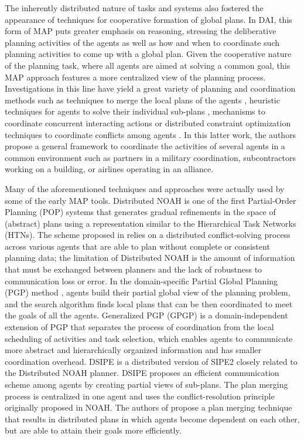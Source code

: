 \documentclass[12pt]{article}
\begin{document}
The inherently distributed nature of tasks and systems also fostered the appearance of techniques for cooperative formation of global plans. In DAI, this form of MAP puts greater emphasis on reasoning, stressing the deliberative planning activities of the agents as well as how and when to coordinate such planning activities to come up with a global plan. Given the cooperative nature of the planning task, where all agents are aimed at solving a common goal, this MAP approach features a more centralized view of the planning process. Investigations in this line have yield a great variety of planning and coordination methods such as techniques to merge the local plans of the agents \cite{Ephrati1994DivideAC}\cite{desJardins1999CoordinatingAD}\cite{1373700}, heuristic techniques for agents to solve their individual sub-plans \cite{Ephrati1997AHT}, mechanisms to coordinate concurrent interacting actions \cite{Boutilier_2001} or distributed constraint optimization techniques to coordinate conflicts among agents \cite{1373700}. In this latter work, the authors propose a general framework to coordinate the activities of several agents in a common environment such as partners in a military coordination, subcontractors working on a building, or airlines operating in an alliance.

Many of the aforementioned techniques and approaches were actually used by some of the early MAP tools. Distributed NOAH \cite{10.5555/1624861.1624903} is one of the first Partial-Order Planning (POP) systems that generates gradual refinements in the space of (abstract) plans using a representation similar to the Hierarchical Task Networks (HTNs). The scheme proposed in \cite{10.5555/1624861.1624903} relies on a distributed conflict-solving process across various agents that are able to plan without complete or consistent planning data; the limitation of Distributed NOAH is the amount of information that must be exchanged between planners and the lack of robustness to communication loss or error. In the domain-specific Partial Global Planning (PGP) method \cite{120067}, agents build their partial global view of the planning problem, and the search algorithm finds local plans that can be then coordinated to meet the goals of all the agents. Generalized PGP (GPGP) is a domain-independent extension of PGP \cite{decker_lesser_1992} that separates the process of coordination from the local scheduling of activities and task selection, which enables agents to communicate more abstract and hierarchically organized information and has smaller coordination overhead. DSIPE \cite{desJardins1999CoordinatingAD} is a distributed version of SIPE2 \cite{10.5555/52077} closely related to the Distributed NOAH planner. DSIPE proposes an efficient communication scheme among agents by creating partial views of sub-plans. The plan merging process is centralized in one agent and uses the conflict-resolution principle originally proposed in NOAH. The authors of \cite{deWeerdt2003} propose a plan merging technique that results in distributed plans in which agents become dependent on each other, but are able to attain their goals more efficiently.
\end{document}
